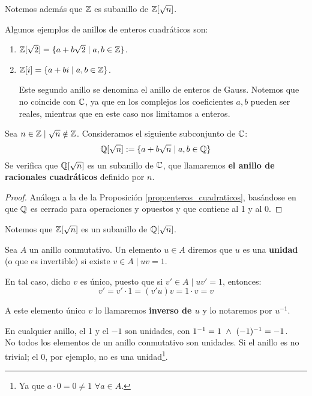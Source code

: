 Notemos además que $\mathbb Z$ es subanillo de $\mathbb Z[\sqrt{n}]$.

\begin{ejemplo} Algunos ejemplos de anillos de enteros cuadráticos son:
\begin{enumerate}
    \item $\mathbb Z[\sqrt{2}] = \{a+b\sqrt{2} \mid a,b \in \mathbb Z\}$.
    \item $\mathbb Z[i] = \{a+bi \mid a,b \in \mathbb Z\}$.

    Este segundo anillo se denomina el anillo de enteros de Gauss. Notemos que no coincide con $\mathbb{C}$, ya que en los complejos los coeficientes $a,b$ pueden ser reales, mientras que en este caso nos limitamos a enteros.
\end{enumerate}
\end{ejemplo}

\begin{prop}
    Sea $n \in \mathbb Z \mid \sqrt{n} \notin \mathbb Z$. Consideramos el siguiente subconjunto de $\mathbb C$:
    $$\mathbb Q[\sqrt{n}] := \{a+b \sqrt{n} \mid a,b \in \mathbb Q\}$$
    Se verifica que $\mathbb Q[\sqrt{n}]$ es un subanillo de $\mathbb C$, que llamaremos \textbf{el anillo de racionales cuadráticos} definido
    por $n$.
\end{prop}
\begin{proof}
    Análoga a la de la Proposición \ref{prop:enteros_cuadraticos}, basándose en que $\mathbb Q$ es cerrado para operaciones y opuestos y que contiene al 1 y al 0.
\end{proof}

Notemos que $\mathbb Z[\sqrt{n}]$ es un subanillo de $\mathbb Q[\sqrt{n}]$.

\begin{definicion}[Unidad]
    Sea $A$ un anillo conmutativo. Un elemento $u \in A$ diremos que $u$ es una \textbf{unidad} (o que es invertible)
    si existe $v \in A \mid uv = 1$.

    En tal caso, dicho $v$ es único, puesto que si $v' \in A \mid uv' = 1$, entonces:
    $$v' = v' \cdot 1 = (v'u)v = 1 \cdot v = v$$

    A este elemento único $v$ lo llamaremos \textbf{inverso de $u$} y lo notaremos por $u^{-1}$.
\end{definicion}

En cualquier anillo, el 1 y el $-1$ son unidades, con $1^{-1} = 1 \ \land \  (-1)^{-1} = -1$.\\


No todos los elementos de un anillo conmutativo son unidades. Si el anillo es no trivial; el 0, por ejemplo, no es una unidad\footnote{Ya que $a\cdot 0=0\neq 1$ $\forall a\in A$.}.\\


